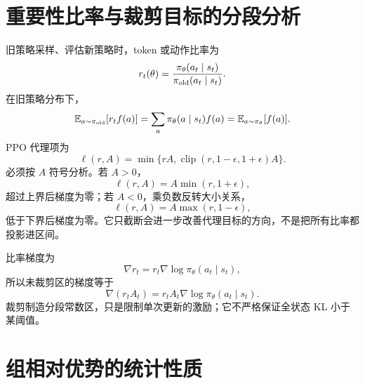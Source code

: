 \documentclass[11pt]{article}
\numberwithin{equation}{section}
\newcommand{\E}{\mathbb{E}}
\newcommand{\1}{\mathbf{1}}
\begin{document}
\section{重要性比率与裁剪目标的分段分析}

旧策略采样、评估新策略时，token 或动作比率为
\begin{equation}
 r_t(\theta)=\frac{\pi_\theta(a_t\mid s_t)}
 {\pi_{\rm old}(a_t\mid s_t)}.
\end{equation}
在旧策略分布下，
\begin{equation}
 \E_{a\sim\pi_{\rm old}}[r_t f(a)]
 =\sum_a\pi_\theta(a\mid s_t)f(a)
 =\E_{a\sim\pi_\theta}[f(a)].
\end{equation}
PPO 代理项为
\begin{equation}
 \ell(r,A)=\min\{rA,\operatorname{clip}(r,1-\epsilon,1+\epsilon)A\}.
\end{equation}
必须按 $A$ 符号分析。若 $A>0$，
\begin{equation}
 \ell(r,A)=A\min(r,1+\epsilon),
\end{equation}
超过上界后梯度为零；若 $A<0$，乘负数反转大小关系，
\begin{equation}
 \ell(r,A)=A\max(r,1-\epsilon),
\end{equation}
低于下界后梯度为零。它只截断会进一步改善代理目标的方向，不是把所有比率都投影进区间。

比率梯度为
\begin{equation}
 \nabla r_t=r_t\nabla\log\pi_\theta(a_t\mid s_t),
\end{equation}
所以未裁剪区的梯度等于
\begin{equation}
 \nabla(r_tA_t)=r_tA_t\nabla\log\pi_\theta(a_t\mid s_t).
\end{equation}
裁剪制造分段常数区，只是限制单次更新的激励；它不严格保证全状态 KL 小于某阈值。

\section{组相对优势的统计性质}
\end{document}

